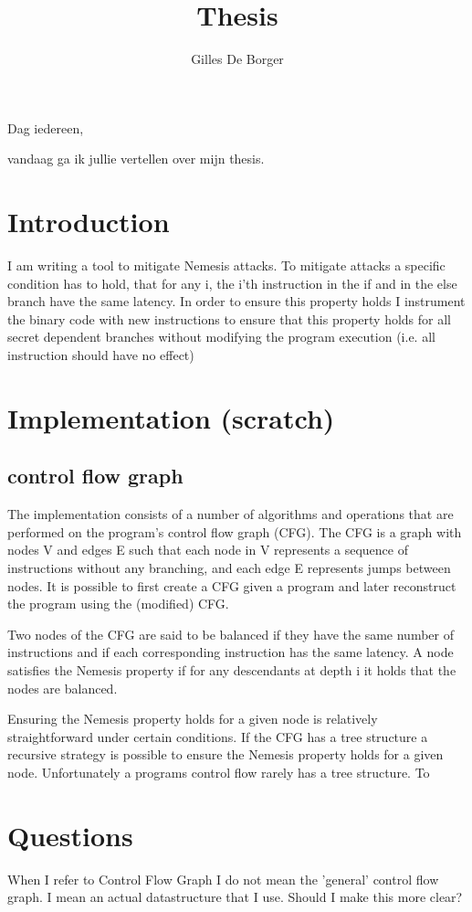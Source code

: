 \documentclass{article}
\author{Gilles De Borger}
\title{Thesis}
\begin{document}
\maketitle

Dag iedereen,

vandaag ga ik jullie vertellen over mijn thesis. 



\section{Introduction}
I am writing a tool to mitigate Nemesis attacks. To mitigate attacks a specific condition has to hold, that for any i, the i'th instruction in the if 
and in the else branch have the same latency.  In order to ensure this property holds I instrument the binary code with new instructions to ensure that
this property holds for all secret dependent branches without modifying the program execution (i.e. all instruction should have no effect)

\section{Implementation (scratch)}
\subsection{control flow graph}
The implementation consists of a number of algorithms and operations that are performed on the program's control flow graph (CFG). The CFG is a 
graph with nodes V and edges E such that each node in V represents a sequence of instructions without any branching, and each edge E represents jumps 
between nodes. It is possible to first create a CFG given a program and later reconstruct the program using the (modified) CFG. 

Two nodes of the CFG are said to be balanced if they have the same number of instructions and if each corresponding instruction has the same latency. 
A node satisfies the Nemesis property if for any descendants at depth i it holds that the nodes are balanced. 

Ensuring the Nemesis property holds for a given node is relatively straightforward under certain conditions. If the CFG has a tree structure a recursive 
strategy is possible to ensure the Nemesis property holds for a given node. Unfortunately a programs control flow rarely has a tree structure. To 





\section{Questions}
When I refer to Control Flow Graph I do not mean the 'general' control flow graph. I mean an actual 
datastructure that I use. Should I make this more clear? 
\end{document}
